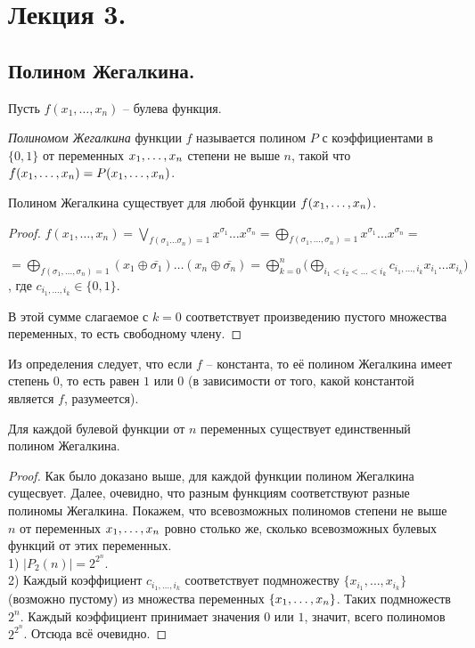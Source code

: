 
\section{Лекция 3.}
\subsection{Полином Жегалкина.} 
Пусть $f(x_1, \ldots, x_n)$ -- булева функция. %
\begin{definition} \textit{Полиномом Жегалкина} функции $f$ называется полином $P$ с коэффициентами в $\{0,1\}$ от переменных $x_1, \ldots, x_n$ степени не выше $n$, такой что $f(x_1, \ldots, x_n) = P(x_1, \ldots, x_n)$. \end{definition}
\begin{statement}
    Полином Жегалкина существует для любой функции $f(x_1, \ldots, x_n)$.
\end{statement}
\begin{proof}
$f(x_1, \ldots, x_n)=\bigvee \limits_{f(\sigma_1 \ldots \sigma_n)=1} x^{\sigma_1} \ldots x^{\sigma_n}=\bigoplus \limits_{f(\sigma_1, \ldots, \sigma_n)=1} x^{\sigma_1} \ldots x^{\sigma_n}=$ 
\begin{flushright}
$
=\bigoplus \limits_{f(\sigma_1, \ldots, \sigma_n)=1} (x_1\oplus \bar{\sigma_1})\ldots(x_n\oplus \bar{\sigma_n})=\bigoplus \limits^n_{k=0} \big( \bigoplus \limits_{i_1<i_2< \ldots<i_k} c_{i_1, \ldots, i_k}x_{i_1} \ldots x_{i_k}\big) $, где  $c_{i_1, \ldots, i_k} \in \{0,1\}$.
\end{flushright} 
В этой сумме слагаемое с $k=0$ соответствует произведению пустого множества переменных, то есть свободному члену.
\end{proof}

Из определения следует, что если $f$ -- константа, то её полином Жегалкина имеет степень $0$, то есть равен $1$ или $0$ (в зависимости от того, какой константой является $f$, разумеется). 
\begin{statement}
	Для каждой булевой функции от $n$ переменных существует единственный полином Жегалкина.
\end{statement}
\begin{proof}
    Как было доказано выше, для каждой функции полином Жегалкина сущесвует. Далее, очевидно, что разным функциям соответствуют разные полиномы Жегалкина. Покажем, что всевозможных полиномов степени не выше $n$ от переменных $x_1, \ldots, x_n$ ровно столько же, сколько всевозможных булевых функций от этих переменных. \\
    1) $|P_2(n)|=2^{2^{n}}$.\\
    2) Каждый коэффициент $c_{i_1, \ldots, i_k}$ соответствует подмножеству $\{x_{i_1}, \ldots, x_{i_k}\}$ (возможно пустому) из множества переменных $\{x_1, \ldots, x_n\}$. Таких подмножеств $2^{n}$. Каждый коэффициент принимает значения $0$ или $1$, значит, всего полиномов $2^{2^n}$. Отсюда всё очевидно.
\end{proof}
